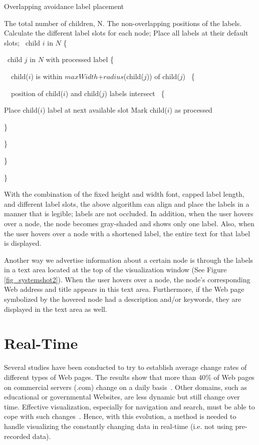 \documentclass[10pt,psfig]{article}
\begin{document}
{\begin{Algorithm} {Overlapping avoidance label placement} {\sf
\vspace*{10pt}
 The total number of children, N.
 The non-overlapping positions of the labels.
\vspace*{10pt}
\row Calculate the different label slots for each node;
\row Place all labels at their default slots;
\vspace*{10pt}
\row  \cforeach\ child $i$ in $N$ \{
\begin{nested}
\row  \cforeach\ child $j$ in $N$ with processed label \{
\begin{nested}
\row \cif\ \ccbeg\ child($i$) is within $maxWidth$+$radius$(child($j$)) of child($j$) \ccend\ \{
\begin{nested}
\row \cif\ \ccbeg\ position of child($i$) and child($j$) labels intersect \ccend\ \{
\begin{nested}
\row Place child($i$) label at next available slot
\row Mark child($i$) as processed
\end{nested}
\row \}
\end{nested}
\row \}
\end{nested}
\row \}
\end{nested}
\row \}
} %
\end{Algorithm}

With the combination of the fixed height and width font, capped label length, and different label slots, the above algorithm can align and place the labels in a manner that is legible; labels are not occluded.
In addition, when the user hovers over a node, the node becomes gray-shaded and shows only one label.
Also, when the user hovers over a node with a shortened label, the entire text for that label is displayed.

Another way we advertise information about a certain node is through the labels in a text area located at the top of the visualization window (See Figure \ref{fig_systemshot2}).
When the user hovers over a node, the node's corresponding Web address and title appears in this text area.
Furthermore, if the Web page symbolized by the hovered node had a description and/or keywords, they are displayed in the text area as well.

\section{Real-Time}
\label{se:real-time}

Several studies have been conducted to try to establish average change rates of different types of Web pages.
The results show that more than 40\% of Web pages on commercial servers (.com) change on a daily basis~\cite{cg00}.
Other domains, such as educational or governmental Websites, are less dynamic but still change over time.
Effective visualization, especially for navigation and search, must be able to cope with such changes~\cite{atlas}.
Hence, with this evolution, a method is needed to handle visualizing the constantly changing data in real-time (i.e. not using pre-recorded data).

}
\end{document}
